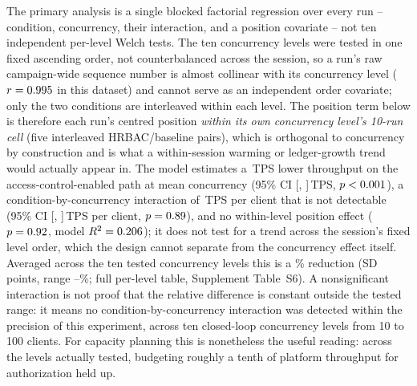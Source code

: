 \documentclass[a4paper,fleqn]{cas-sc}
\begin{document}
The primary analysis is a single blocked factorial regression over every
run -- condition, concurrency, their interaction, and a position
covariate -- not ten independent per-level Welch tests. The ten
concurrency levels were tested in one fixed ascending order, not
counterbalanced across the session, so a run's raw campaign-wide sequence
number is almost collinear with its concurrency level
($r=0.995$ in this dataset) and cannot serve as an
independent order covariate; only the two conditions are interleaved
within each level. The position term below is therefore each run's
centred position \emph{within its own concurrency level's 10-run cell}
(five interleaved HRBAC/baseline pairs), which is orthogonal to
concurrency by construction and is what a within-session warming or
ledger-growth trend would actually appear in. The model estimates a
\ThrCondCoef\,TPS lower throughput on the access-control-enabled path at
mean concurrency (95\% CI [\ThrCondCoefCILow, \ThrCondCoefCIHigh]\,TPS,
$p<0.001$), a condition-by-concurrency interaction of
\ThrInteractCoef\,TPS per client that is not detectable (95\% CI
[\ThrInteractCILow, \ThrInteractCIHigh]\,TPS per client,
$p=0.89$), and no within-level position effect
($p=0.92$, model $R^2=0.206$); it does not test for a
trend across the session's fixed level order, which the design cannot
separate from the concurrency effect itself. Averaged across the ten
tested concurrency
levels this is a \OverheadMeanPct\% reduction (SD \OverheadSDPct{} points,
range \OverheadMinPct--\OverheadMaxPct\%; full per-level table,
Supplement Table~S6). A nonsignificant interaction is not proof that the
relative difference is constant outside the tested range: it means no
condition-by-concurrency interaction was detected within the precision of
this experiment, across ten closed-loop concurrency levels from 10 to 100
clients. For capacity planning this is nonetheless the useful reading:
across the levels actually tested, budgeting roughly a tenth of platform
throughput for authorization held up.
\end{document}

